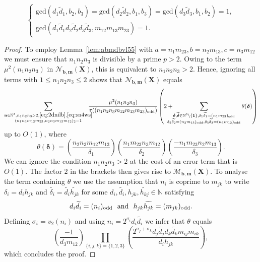 \documentclass[a4paper,12pt,reqno]{amsart}
\numberwithin{equation}{section} \numberwithin{figure}{section}
\newcommand\N{\mathbb{N}}
\renewcommand{\l}{\left}
\renewcommand{\r}{\right}
\renewcommand{\b}{\mathbf}
\renewcommand{\c}{\mathcal}
\renewcommand{\gcd}{\textrm{gcd}}
\renewcommand{\leq}{\leqslant}
\renewcommand{\#}{\sharp}
\theoremstyle{definition}
\numberwithin{lemma}{section}
\begin{document}
  \begin{equation}\label{eq:commonivy2}
\begin{cases}     \gcd(  d_1 \widetilde d_1 ,b_2,b_3) =\gcd(d_2 \widetilde d_2  ,b_1,b_3)=\gcd(d_3 \widetilde d_3  ,b_1,b_2) =1, \\
\gcd(d_1 \widetilde d_1d_2 \widetilde d_2d_3 \widetilde d_3,m_{12}m_{13}m_{23})=1.
\end{cases}
\end{equation} 


\begin{proof}  To employ Lemma~\ref{lem:abmdbvl55} 
with $ a=n_1       m_{23}, b= n_2     m_{13}, c = n_3  m_{12} $ we must ensure that  $n_1n_2n_3$ is divisible by a prime $p>2$.
Owing  to  the term $\mu^2(n_1n_2n_3)$    in $\c N_{\b b , \b m }(\b X)$, this is  equivalent to $n_1n_2n_3>2$.
 Hence, ignoring all terms with 
 $1\leq n_1n_2n_3\leq 2 $ shows that $\c N_{\b b , \b m }(\b X)$ equals 
$$
\sum_{\substack{\b n \in \N^3, n_1n_2n_3>2, \eqref{eq:2dnilb}, \eqref{eq:sn4ws}  \\
(n_1   n_3   m_{12}  m_{23}  ,n_2    n_3  m_{13} m_{12} )_2 =1}} 
\hspace{-0,3cm}
\frac{\mu^2(n_1n_2n_3)}{\tau((n_1n_2n_3m_{12}    m_{13} m_{23})_{\rm{odd}})} 
 \left(2+\hspace{-0,4cm}
\sum_{\substack{\boldsymbol  \delta , \widetilde {\boldsymbol \delta} \in \N^3\setminus\{\b 1 \} , \delta_1\widetilde {\delta_1}= (n_1       m_{23})_{\rm{odd}}\\ \delta_2\widetilde {\delta_2}=( n_2     m_{13})_{\rm{odd}}, \delta_3 \widetilde {\delta_3}= (n_3  m_{12})_{\rm{odd}}} } 
\theta(\boldsymbol  \delta )  \right) $$  up to $O(1)$, where $$\theta(\boldsymbol  \delta )=
\left(\frac{n_2   n_3  m_{12} m_{13}   }{\delta_1}\right)  
\left(\frac{n_1       m_{23}n_3  m_{12} }{\delta_2}\right) \left(\frac{-n_1       m_{23}n_2     m_{13}}{\delta_3}\right)
.$$ We can ignore the condition $n_1n_2n_3>2$ at the cost of an error term that is $O(1)$.
The factor $2$ in the brackets then gives rise to $\c M_{\b b , \b m }(\b X) $. To analyse the term containing     $\theta$ 
we use the assumption that $n_i$ is coprime to $m_{jk}$ to write 
$\delta_i = d_i h_{jk}$ and $ \widetilde{ \delta_i} =  \widetilde{ d_i } \widetilde {h_{jk} }$ 
for some $d_i,\widetilde {d_i}, h_{jk}, \widetilde {h_{kj} } \in \N$
satisfying  $$d_i\widetilde {d_i}=( n_i)_{\rm{odd}} \ \textrm { and } \ h_{jk}\widetilde {h_{jk}}=(       m_{jk})_{\rm{odd}}.$$  
Defining $\sigma_i=v_2(n_i)$   and using $n_i =2^{\sigma_i} d_i\widetilde {d_i}$ we infer that $\theta$ equals 
\[\l(\frac{-1}{d_3m_{12} }\r)\prod_{\{i,j,k\}=\{1,2,3\}}\l(\frac{2^{\sigma_j+\sigma_k}d_j \widetilde {d_j} d_k \widetilde {d_k}m_{ij}m_{ik}}{d_i h_{jk}}\r), \] 
which concludes the proof.\end{proof}
\end{document}
